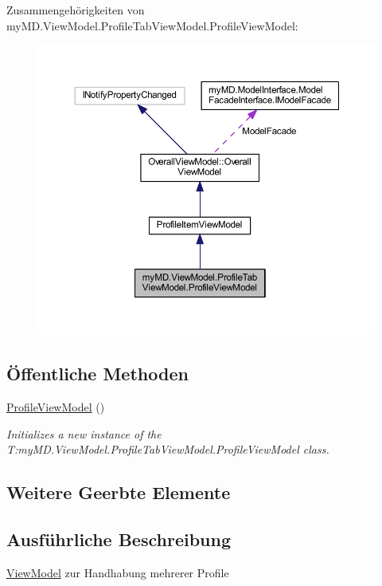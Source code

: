 Zusammengehörigkeiten von my\+M\+D.\+View\+Model.\+Profile\+Tab\+View\+Model.\+Profile\+View\+Model\+:\nopagebreak
\begin{figure}[H]
\begin{center}
\leavevmode
\includegraphics[width=350pt]{classmy_m_d_1_1_view_model_1_1_profile_tab_view_model_1_1_profile_view_model__coll__graph}
\end{center}
\end{figure}
\subsection*{Öffentliche Methoden}
\begin{DoxyCompactItemize}
\item 
\mbox{\hyperlink{classmy_m_d_1_1_view_model_1_1_profile_tab_view_model_1_1_profile_view_model_aa7d7cd132645a689b99eccd006b51c40}{Profile\+View\+Model}} ()
\begin{DoxyCompactList}\small\item\em Initializes a new instance of the T\+:my\+M\+D.\+View\+Model.\+Profile\+Tab\+View\+Model.\+Profile\+View\+Model class. \end{DoxyCompactList}\end{DoxyCompactItemize}
\subsection*{Weitere Geerbte Elemente}


\subsection{Ausführliche Beschreibung}
\mbox{\hyperlink{namespacemy_m_d_1_1_view_model}{View\+Model}} zur Handhabung mehrerer Profile 



